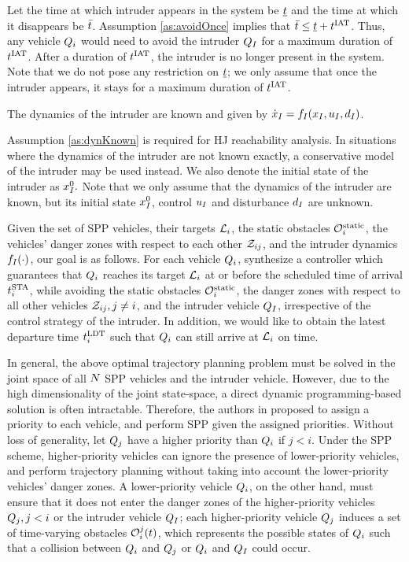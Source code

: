 Let the time at which intruder appears in the system be $\underline{t}$ and the time at which it disappears be $\bar{t}$. Assumption \ref{as:avoidOnce} implies that $\bar{t} \leq \underline{t} + t^\text{IAT}$. Thus, any vehicle $Q_i$ would need to avoid the intruder $Q_{I}$ for a maximum duration of $t^\text{IAT}$. After a duration of $t^\text{IAT}$, the intruder is no longer present in the system. Note that we do not pose any restriction on $\underline{t}$; we only assume that once the intruder appears, it stays for a maximum duration of $t^\text{IAT}$.
\begin{assumption}
\label{as:dynKnown}
The dynamics of the intruder are known and given by $\dot{x}_I = f_I(x_I, u_I, d_I)$.
\end{assumption}
Assumption \ref{as:dynKnown} is required for HJ reachability analysis. In situations where the dynamics of the intruder are not known exactly, a conservative model of the intruder may be used instead. We also denote the initial state of the intruder as $x_{I}^0.$ Note that we only assume that the dynamics of the intruder are known, but its initial state $x_{I}^0$, control $u_I$ and disturbance $d_I$ are unknown.

Given the set of SPP vehicles, their targets $\mathcal{L}_i$, the static obstacles $\mathcal{O}^\text{static}_i$, the vehicles' danger zones with respect to each other $\mathcal{Z}_{ij}$, and the intruder dynamics $f_I(\cdot)$, our goal is as follows. For each vehicle $Q_i$, synthesize a controller which guarantees that $Q_i$ reaches its target $\mathcal{L}_i$ at or before the scheduled time of arrival $t^\text{STA}_i$, while avoiding the static obstacles $\mathcal{O}^\text{static}_i$, the danger zones with respect to all other vehicles $\mathcal{Z}_{ij}, j\neq i$, and the intruder vehicle $Q_{I}$, irrespective of the control strategy of the intruder. In addition, we would like to obtain the latest departure time $t^\text{LDT}_i$ such that $Q_i$ can still arrive at $\mathcal{L}_i$ on time.

In general, the above optimal trajectory planning problem must be solved in the joint space of all $N$ SPP vehicles and the intruder vehicle. However, due to the high dimensionality of the joint state-space, a direct dynamic programming-based solution is often intractable. Therefore, the authors in \cite{Chen15c} proposed to assign a priority to each vehicle, and perform SPP given the assigned priorities. Without loss of generality, let $Q_j$ have a higher priority than $Q_i$ if $j<i$. Under the SPP scheme, higher-priority vehicles can ignore the presence of lower-priority vehicles, and perform trajectory planning without taking into account the lower-priority vehicles' danger zones. A lower-priority vehicle $Q_i$, on the other hand, must ensure that it does not enter the danger zones of the higher-priority vehicles $Q_j, j<i$ or the intruder vehicle $Q_{I}$; each higher-priority vehicle $Q_j$ induces a set of time-varying obstacles $\mathcal{O}_i^j(t)$, which represents the possible states of $Q_i$ such that a collision between $Q_i$ and $Q_j$ or $Q_i$ and $Q_{I}$ could occur.

